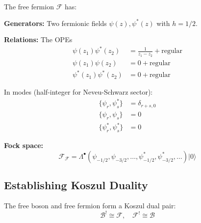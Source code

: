 The free fermion $\mathcal{F}$ has:

\textbf{Generators:} Two fermionic fields $\psi(z), \psi^*(z)$ with $h = 1/2$.

\textbf{Relations:} The OPEs
\begin{align}
\psi(z_1)\psi^*(z_2) &= \frac{1}{z_1-z_2} + \text{regular} \\
\psi(z_1)\psi(z_2) &= 0 + \text{regular} \\
\psi^*(z_1)\psi^*(z_2) &= 0 + \text{regular}
\end{align}

In modes (half-integer for Neveu-Schwarz sector):
\begin{align}
\{\psi_r, \psi^*_s\} &= \delta_{r+s,0} \\
\{\psi_r, \psi_s\} &= 0 \\
\{\psi^*_r, \psi^*_s\} &= 0
\end{align}

\textbf{Fock space:}
\[
\mathcal{F}_{\mathcal{F}} = \Lambda^{\bullet}(\psi_{-1/2}, \psi_{-3/2}, \ldots, \psi^*_{-1/2}, \psi^*_{-3/2}, \ldots) |0\rangle
\]

\subsection{Establishing Koszul Duality}

\begin{theorem}
The free boson and free fermion form a Koszul dual pair:
\[
\mathcal{B}^! \cong \mathcal{F}, \quad \mathcal{F}^! \cong \mathcal{B}
\]
\end{theorem}

